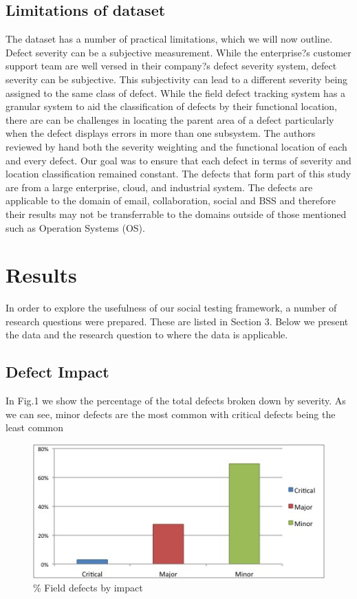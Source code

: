 \documentclass[conference]{IEEEtran}
\begin{document}
\subsection{Limitations of dataset}

The dataset has a number of practical limitations, which we will now outline. Defect severity can be a subjective measurement. While the enterprise?s customer support team are well versed in their company?s defect severity system, defect severity can be subjective. This subjectivity can lead to a different severity being assigned to the same class of defect.
While the field defect tracking system has a granular system to aid the classification of defects by their functional location, there are can be challenges in locating the parent area of a defect particularly when the defect displays errors in more than one subsystem.
The authors reviewed by hand both the severity weighting and the functional location of each and every defect. Our goal was to ensure that each defect in terms of severity and location classification remained constant.
The defects that form part of this study are from a large enterprise, cloud, and industrial system. The defects are applicable to the domain of email, collaboration, social and BSS and therefore their results may not be transferrable to the domains outside of those mentioned such as Operation Systems (OS). 

\section{Results}

In order to explore the usefulness of our social testing framework, a number of research questions were prepared. These are listed in Section 3. Below we present the data and the research question to where the data is applicable. 

\subsection{Defect Impact}

In Fig.1 we show the percentage of the total defects broken down by severity. As we can see, minor defects are the most common with critical defects being the least common

\begin{figure}[h]
\caption{\% Field defects by impact}
\begin{center}
\includegraphics[width=\columnwidth]{graphs/graph1.jpg} 
\end{center}
\label{fig:defectimpact}
\end{figure}
\end{document}
